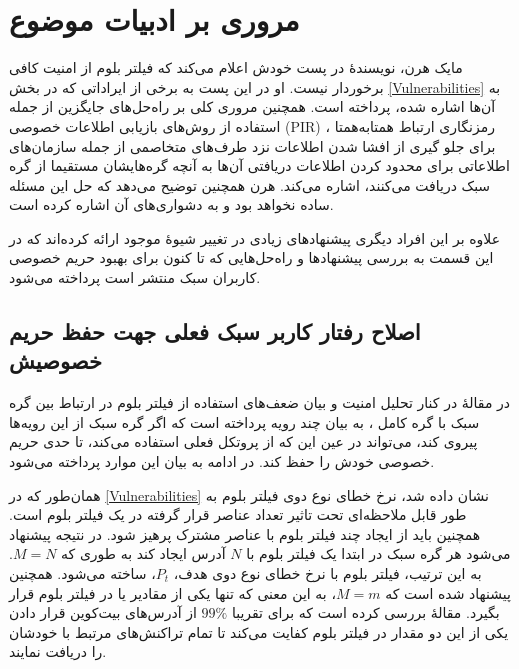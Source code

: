 \section{مروری بر ادبیات موضوع}
\label{LitReview}

مایک هرن، نویسندهٔ  \cite{Hearn2013}
در پست \cite{Hearn2015} خودش اعلام می‌کند که فیلتر بلوم از امنیت کافی برخوردار نیست. او در این پست به برخی از ایراداتی که در بخش \ref{Vulnerabilities} به آن‌ها اشاره شده، پرداخته است. همچنین مروری کلی بر راه‌حل‌های جایگزین از جمله استفاده از روش‌های بازیابی اطلاعات خصوصی
(PIR)
، رمزنگاری ارتباط همتا‌به‌همتا برای جلو گیری از افشا شدن اطلاعات نزد طرف‌های متخاصمی از جمله سازمان‌های اطلاعاتی برای محدود کردن اطلاعات دریافتی آن‌ها به آنچه گره‌هایشان مستقیما از گره سبک دریافت می‌کنند، اشاره می‌کند. هرن همچنین توضیح می‌دهد که حل این مسئله ساده نخواهد بود و به دشواری‌های آن اشاره کرده است\cite{Hearn2015}.

علاوه بر این افراد دیگری پیشنهاد‌های زیادی در تغییر شیوهٔ موجود ارائه کرده‌اند که در این قسمت به بررسی پیشنهاد‌ها و راه‌حل‌هایی که تا کنون برای بهبود حریم خصوصی کاربران سبک منتشر است پرداخته می‌شود. 


\subsection{
اصلاح رفتار کاربر سبک فعلی جهت حفظ حریم خصوصیش
}
\label{change_behaviour}
در مقالهٔ \cite{Gervais2014} در کنار تحلیل امنیت و بیان ضعف‌های استفاده از فیلتر بلوم در ارتباط بین گره سبک با گره کامل \cite{Hearn2013}، به بیان چند رویه پرداخته است که اگر گره سبک از این رویه‌ها پیروی کند، می‌تواند در عین این که از پروتکل فعلی استفاده می‌کند، تا حدی حریم خصوصی خودش را حفظ کند. در ادامه به بیان این موارد پرداخته می‌شود.

	همان‌طور که در \ref{Vulnerabilities} نشان داده شد، نرخ خطای نوع دوی فیلتر بلوم به طور قابل ملاحظه‌ای تحت تاثیر تعداد عناصر قرار گرفته در یک فیلتر بلوم است. همچنین باید از ایجاد چند فیلتر بلوم با عناصر مشترک پرهیز شود. در نتیجه پیشنهاد می‌شود هر گره سبک در ابتدا یک فیلتر بلوم با $N$ آدرس ایجاد کند به طوری که $M=N$. به این ترتیب، فیلتر بلوم با نرخ خطای نوع دوی هدف، $P_t$، ساخته می‌شود. همچنین پیشنهاد شده است که $M=m$، به این معنی که تنها یکی از مقادیر  یا  در فیلتر بلوم قرار بگیرد. مقالهٔ \cite{Gervais2014} بررسی کرده است که برای تقریبا $99\%$ از آدرس‌های بیت‌کوین قرار دادن یکی از این دو مقدار در فیلتر بلوم کفایت می‌کند تا تمام تراکنش‌های مرتبط  با خودشان را دریافت نمایند.
	

